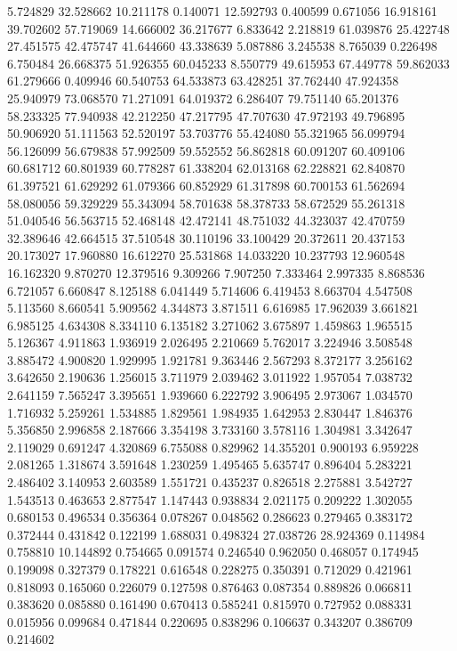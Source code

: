 5.724829
32.528662
10.211178
0.140071
12.592793
0.400599
0.671056
16.918161
39.702602
57.719069
14.666002
36.217677
6.833642
2.218819
61.039876
25.422748
27.451575
42.475747
41.644660
43.338639
5.087886
3.245538
8.765039
0.226498
6.750484
26.668375
51.926355
60.045233
8.550779
49.615953
67.449778
59.862033
61.279666
0.409946
60.540753
64.533873
63.428251
37.762440
47.924358
25.940979
73.068570
71.271091
64.019372
6.286407
79.751140
65.201376
58.233325
77.940938
42.212250
47.217795
47.707630
47.972193
49.796895
50.906920
51.111563
52.520197
53.703776
55.424080
55.321965
56.099794
56.126099
56.679838
57.992509
59.552552
56.862818
60.091207
60.409106
60.681712
60.801939
60.778287
61.338204
62.013168
62.228821
62.840870
61.397521
61.629292
61.079366
60.852929
61.317898
60.700153
61.562694
58.080056
59.329229
55.343094
58.701638
58.378733
58.672529
55.261318
51.040546
56.563715
52.468148
42.472141
48.751032
44.323037
42.470759
32.389646
42.664515
37.510548
30.110196
33.100429
20.372611
20.437153
20.173027
17.960880
16.612270
25.531868
14.033220
10.237793
12.960548
16.162320
9.870270
12.379516
9.309266
7.907250
7.333464
2.997335
8.868536
6.721057
6.660847
8.125188
6.041449
5.714606
6.419453
8.663704
4.547508
5.113560
8.660541
5.909562
4.344873
3.871511
6.616985
17.962039
3.661821
6.985125
4.634308
8.334110
6.135182
3.271062
3.675897
1.459863
1.965515
5.126367
4.911863
1.936919
2.026495
2.210669
5.762017
3.224946
3.508548
3.885472
4.900820
1.929995
1.921781
9.363446
2.567293
8.372177
3.256162
3.642650
2.190636
1.256015
3.711979
2.039462
3.011922
1.957054
7.038732
2.641159
7.565247
3.395651
1.939660
6.222792
3.906495
2.973067
1.034570
1.716932
5.259261
1.534885
1.829561
1.984935
1.642953
2.830447
1.846376
5.356850
2.996858
2.187666
3.354198
3.733160
3.578116
1.304981
3.342647
2.119029
0.691247
4.320869
6.755088
0.829962
14.355201
0.900193
6.959228
2.081265
1.318674
3.591648
1.230259
1.495465
5.635747
0.896404
5.283221
2.486402
3.140953
2.603589
1.551721
0.435237
0.826518
2.275881
3.542727
1.543513
0.463653
2.877547
1.147443
0.938834
2.021175
0.209222
1.302055
0.680153
0.496534
0.356364
0.078267
0.048562
0.286623
0.279465
0.383172
0.372444
0.431842
0.122199
1.688031
0.498324
27.038726
28.924369
0.114984
0.758810
10.144892
0.754665
0.091574
0.246540
0.962050
0.468057
0.174945
0.199098
0.327379
0.178221
0.616548
0.228275
0.350391
0.712029
0.421961
0.818093
0.165060
0.226079
0.127598
0.876463
0.087354
0.889826
0.066811
0.383620
0.085880
0.161490
0.670413
0.585241
0.815970
0.727952
0.088331
0.015956
0.099684
0.471844
0.220695
0.838296
0.106637
0.343207
0.386709
0.214602
